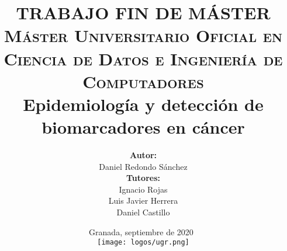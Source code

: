 \documentclass[a4paper, 12pt]{bookln9}
\begin{document}
 \pagestyle{fancyplain}
 \lhead[\fancyplain{}{\small\bf\thepage}]{\fancyplain{}{\small\bf\rightmark}}
 \rhead[\fancyplain{}{\small\bf\leftmark}]{\fancyplain{}{\small\bf\thepage}}
 \cfoot[\fancyplain{\small\bf\thepage}{}]{\fancyplain{\small\bf\thepage}{}}

\author{\textbf{Autor:}\vspace{-0.1cm}\\ Daniel Redondo Sánchez \vspace{0.2cm}\\
\textbf{Tutores:}\vspace{0.1cm}\\
Ignacio Rojas\\
Luis Javier Herrera\\
Daniel Castillo
}
	
\title{
	\vspace{-4cm}
	\centering
	{\Large TRABAJO FIN DE MÁSTER\\} \vspace{0.3cm}
	{\large \textsc{Máster Universitario Oficial en Ciencia de Datos e Ingeniería de Computadores\\}}
		{\LARGE \textbf{\bfseries{Epidemiología y detección de biomarcadores en cáncer\\}}}
		\vspace{-0.75cm}
}


\date{\vspace{1cm}
	Granada, septiembre de 2020 \\
	\vspace{0.5cm}
	\texttt{[image: logos/ugr.png]} \\ 
}
	
	\mainmatter
	\maketitle
	\thispagestyle{empty}
	
	
	\tableofcontents
		
	
	
	
	
	
\end{document}
